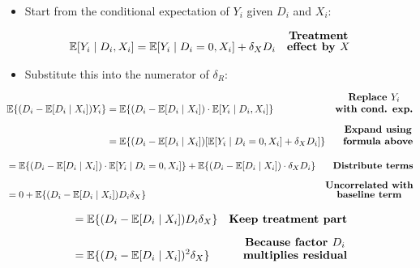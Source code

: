 \documentclass[12pt]{article}
\begin{document}
\begin{itemize}
    \item Start from the conditional expectation of $Y_i$ given $D_i$ and $X_i$:
\end{itemize}

\singlespacing
\begin{align}
\mathbb{E}[Y_i \mid D_i, X_i] 
   &= \mathbb{E}[Y_i \mid D_i=0, X_i] + \delta_{X} D_i 
   & \text{\textbf{\shortstack{Treatment \\ effect by $X$}}}
\end{align}

\begin{itemize}
    \item Substitute this into the numerator of $\delta_R$:
\end{itemize}

\singlespacing
\begin{align}
\mathbb{E}\{ (D_i - \mathbb{E}[D_i \mid X_i]) Y_i \} 
   &= \mathbb{E}\{ (D_i - \mathbb{E}[D_i \mid X_i]) \cdot \mathbb{E}[Y_i \mid D_i, X_i] \} 
   & \text{\textbf{\shortstack{Replace $Y_i$ \\ with cond. exp.}}} \\[6pt]
&= \mathbb{E}\{ (D_i - \mathbb{E}[D_i \mid X_i]) [\mathbb{E}[Y_i \mid D_i=0, X_i] + \delta_X D_i] \} 
   & \text{\textbf{\shortstack{Expand using \\ formula above}}}
\end{align}

\singlespacing
\begin{align}
&= \mathbb{E}\{ (D_i - \mathbb{E}[D_i \mid X_i]) \cdot \mathbb{E}[Y_i \mid D_i=0, X_i] \} 
   + \mathbb{E}\{ (D_i - \mathbb{E}[D_i \mid X_i]) \cdot \delta_X D_i \} 
   & \text{\textbf{Distribute terms}} \\[6pt]
&= 0 + \mathbb{E}\{ (D_i - \mathbb{E}[D_i \mid X_i]) D_i \delta_X \} 
   & \text{\textbf{\shortstack{Uncorrelated with \\ baseline term}}}
\end{align}

\singlespacing
\begin{align}
&= \mathbb{E}\{ (D_i - \mathbb{E}[D_i \mid X_i]) D_i \delta_X \} 
   & \text{\textbf{Keep treatment part}} \\[6pt]
&= \mathbb{E}\{ (D_i - \mathbb{E}[D_i \mid X_i])^2 \delta_X \} 
   & \text{\textbf{\shortstack{Because factor $D_i$ \\ multiplies residual}}}
\end{align}
\end{document}
